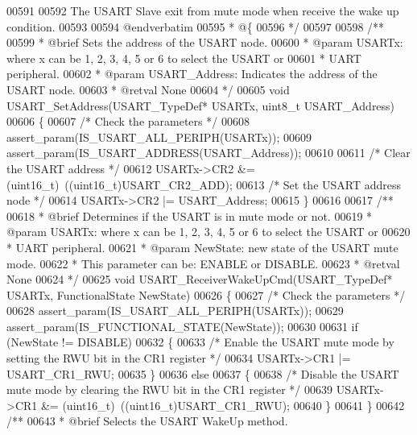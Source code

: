 \begin{DoxyCode}
00591 \textcolor{comment}{}
00592 \textcolor{comment}{  The USART Slave exit from mute mode when receive the wake up condition.}
00593 \textcolor{comment}{}
00594 \textcolor{comment}{@endverbatim}
00595 \textcolor{comment}{  * @\{}
00596 \textcolor{comment}{  */}
00597 
00598 \textcolor{comment}{/**}
00599 \textcolor{comment}{  * @brief  Sets the address of the USART node.}
00600 \textcolor{comment}{  * @param  USARTx: where x can be 1, 2, 3, 4, 5 or 6 to select the USART or }
00601 \textcolor{comment}{  *         UART peripheral.}
00602 \textcolor{comment}{  * @param  USART\_Address: Indicates the address of the USART node.}
00603 \textcolor{comment}{  * @retval None}
00604 \textcolor{comment}{  */}
00605 \textcolor{keywordtype}{void} USART_SetAddress(USART\_TypeDef* USARTx, uint8\_t USART\_Address)
00606 \{
00607   \textcolor{comment}{/* Check the parameters */}
00608   assert_param(IS\_USART\_ALL\_PERIPH(USARTx));
00609   assert_param(IS\_USART\_ADDRESS(USART\_Address));
00610 
00611   \textcolor{comment}{/* Clear the USART address */}
00612   USARTx->CR2 &= (uint16\_t)~((uint16\_t)USART_CR2_ADD);
00613   \textcolor{comment}{/* Set the USART address node */}
00614   USARTx->CR2 |= USART\_Address;
00615 \}
00616 
00617 \textcolor{comment}{/**}
00618 \textcolor{comment}{  * @brief  Determines if the USART is in mute mode or not.}
00619 \textcolor{comment}{  * @param  USARTx: where x can be 1, 2, 3, 4, 5 or 6 to select the USART or }
00620 \textcolor{comment}{  *         UART peripheral.}
00621 \textcolor{comment}{  * @param  NewState: new state of the USART mute mode.}
00622 \textcolor{comment}{  *          This parameter can be: ENABLE or DISABLE.}
00623 \textcolor{comment}{  * @retval None}
00624 \textcolor{comment}{  */}
00625 \textcolor{keywordtype}{void} USART_ReceiverWakeUpCmd(USART\_TypeDef* USARTx, FunctionalState NewState)
00626 \{
00627   \textcolor{comment}{/* Check the parameters */}
00628   assert_param(IS\_USART\_ALL\_PERIPH(USARTx));
00629   assert_param(IS\_FUNCTIONAL\_STATE(NewState));
00630 
00631   \textcolor{keywordflow}{if} (NewState != DISABLE)
00632   \{
00633     \textcolor{comment}{/* Enable the USART mute mode  by setting the RWU bit in the CR1 register */}
00634     USARTx->CR1 |= USART_CR1_RWU;
00635   \}
00636   \textcolor{keywordflow}{else}
00637   \{
00638     \textcolor{comment}{/* Disable the USART mute mode by clearing the RWU bit in the CR1 register */}
00639     USARTx->CR1 &= (uint16\_t)~((uint16\_t)USART_CR1_RWU);
00640   \}
00641 \}
00642 \textcolor{comment}{/**}
00643 \textcolor{comment}{  * @brief  Selects the USART WakeUp method.}

\end{DoxyCode}
